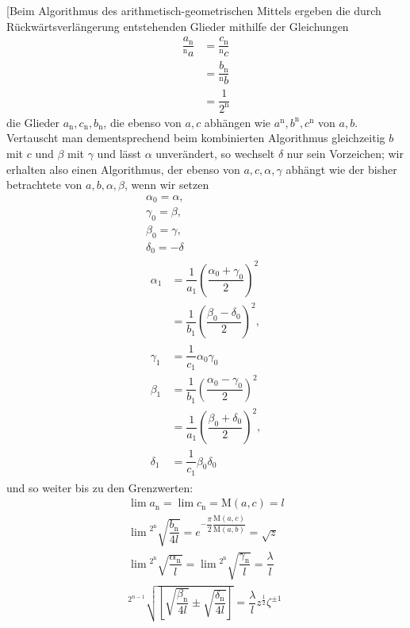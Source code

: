 [Beim Algorithmus des arithmetisch-geometrischen Mittels ergeben die durch Rückwärtsverlängerung entstehenden Glieder mithilfe der Gleichungen
\[
\begin{aligned}\dfrac{a_{\mathrm n}}{{}^{\mathrm n}\!a}&=\dfrac{c_{\mathrm n}}{{}^{\mathrm n}\!c}\\[7pt]&=\dfrac{b_{\mathrm n}}{{}^{\mathrm n}\!b}\\[7pt]&=\dfrac{1}{2^{\mathrm n}}\end{aligned}
\]
die Glieder $a_{\mathrm n},\allowbreak c_{\mathrm n},\allowbreak b_{\mathrm n}$, die ebenso von $a,\allowbreak c$ abhängen wie $a^{\mathrm n},\allowbreak b^{\mathrm n},\allowbreak c^{\mathrm n}$ von $a,\allowbreak b$. Vertauscht man dementsprechend beim kombinierten Algorithmus gleichzeitig $b$ mit $c$ und $\beta$ mit $\gamma$ und lässt $\alpha$ unverändert, so wechselt $\delta$ nur sein Vorzeichen; wir erhalten also einen Algorithmus, der ebenso von $a,\allowbreak c,\allowbreak \alpha,\allowbreak \gamma$ abhängt wie der bisher betrachtete von $a,\allowbreak b,\allowbreak \alpha,\allowbreak \beta$, wenn wir setzen
\[
\begin{gathered}
\alpha_0=\alpha,\\[7pt]\gamma_0=\beta,\\[7pt]\beta_0=\gamma,\\[7pt]\delta_0=-\delta\\[8pt]
\begin{aligned}
\alpha_1&=\dfrac{1}{a_1}\left(\dfrac{\alpha_0+\gamma_0}{2}\right)^2
\\[6pt]&=\dfrac{1}{b_1}\left(\dfrac{\beta_0-\delta_0}{2}\right)^2,
\\[7pt]\gamma_1&=\dfrac{1}{c_1}\alpha_0\gamma_0\\[8pt]
\beta_1&=\dfrac{1}{b_1}\left(\dfrac{\alpha_0-\gamma_0}{2}\right)^2
\\[6pt]&=\dfrac{1}{a_1}\left(\dfrac{\beta_0+\delta_0}{2}\right)^2,
\\[7pt]\delta_1&=\dfrac{1}{c_1}\beta_0\delta_0
\end{aligned}
\end{gathered}
\]
und so weiter bis zu den Grenzwerten:
\[
\begin{gathered}
\lim a_{\mathrm n}=\lim c_{\mathrm n}=\mathrm{M}(a,c)=l\\[7pt]
\lim{}^{2^{\mathrm n}}\!\surd {\dfrac{b_{\mathrm n}}{4l}}=e^{-\dfrac{\pi}{2}\dfrac{\mathrm{M}(a,c)}{\mathrm{M}(a,b)}}=\surd  z\\[7pt]
\lim{}^{2^{\mathrm n}}\!\surd {\dfrac{\alpha_{\mathrm n}}{l}}=\lim{}^{2^{\mathrm n}}\!\surd {\dfrac{\gamma_{\mathrm n}}{l}}=\dfrac{\lambda}{l}\\[7pt]
{}^{2^{n-1}}\!\surd {\left[\surd {\dfrac{\beta_{\mathrm n}}{4l}}\mathbin{\pm}\surd {\dfrac{\delta_{\mathrm n}}{4l}}\right]}=\dfrac{\lambda}{l}z^{\frac12}\zeta^{\pm1}
\end{gathered}
\]

